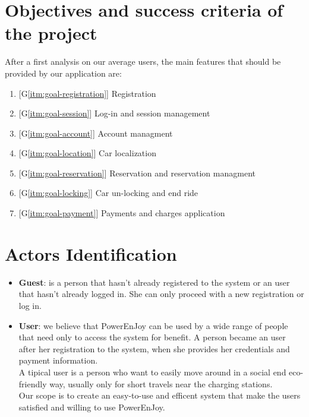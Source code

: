 \section{Objectives and success criteria of the project}
\label{sec: proj_objectives}
After a first analysis on our average users, the main features that should be provided by our application are:
\begin{enumerate}
	\item{[G\ref{itm:goal-registration}] Registration}\label{itm:goal-registration} 
	\item{[G\ref{itm:goal-session}] Log-in and session management}\label{itm:goal-session}
	\item{[G\ref{itm:goal-account}] Account managment}\label{itm:goal-account}
	\item{[G\ref{itm:goal-location}] Car localization}\label{itm:goal-location}
	\item{[G\ref{itm:goal-reservation}] Reservation and reservation managment}\label{itm:goal-reservation}
	\item{[G\ref{itm:goal-locking}] Car un-locking and end ride}\label{itm:goal-locking} 
	\item{[G\ref{itm:goal-payment}] Payments and charges application}\label{itm:goal-payment}
\end{enumerate}

\section{Actors Identification}
\begin{itemize}
	\item{{\bf Guest}: is a person that hasn't already registered to the system or an user that hasn't already logged in. She can only proceed with a new registration or log in.}
	\item{{\bf User}: we believe that PowerEnJoy can be used by a wide range of people that need only to access the system for benefit. A person became an user after her registration to the system, when she provides her credentials and payment information. 
	\\A tipical user is a person who want to easily move around in a social end eco-friendly way, usually only for short travels near the \glspl{charging station}.
	\\Our scope is to create an easy-to-use and efficent system that make the users satisfied and willing to use PowerEnJoy.}
\end{itemize}


